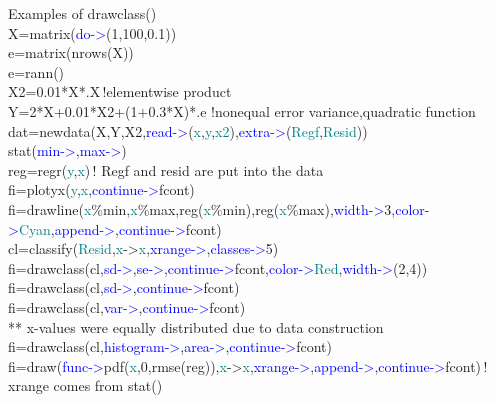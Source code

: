 \begin{example}[drawclassex]Examples of \textcolor{VioletRed}{drawclass}()\\ 
\label{drawclassex} 
\noindent X=\textcolor{VioletRed}{matrix}(\textcolor{blue}{do->}(1,100,0.1))\\ 
e=\textcolor{VioletRed}{matrix}(\textcolor{VioletRed}{nrows}(X))\\ 
e=\textcolor{VioletRed}{rann}()\\ 
X2=0.01*X*.X\,{\color{ForestGreen}!elementwise product}\\ 
Y=2*X+0.01*X2+(1+0.3*X)*.e\,\,{\color{ForestGreen}!nonequal error variance,quadratic function}\\ 
dat=\textcolor{VioletRed}{newdata}(X,Y,X2,\textcolor{blue}{read->}(\textcolor{teal}{x},\textcolor{teal}{y},\textcolor{teal}{x2}),\textcolor{blue}{extra->}(\textcolor{teal}{Regf},\textcolor{teal}{Resid}))\\ 
\textcolor{VioletRed}{stat}(\textcolor{blue}{min->},\textcolor{blue}{max->})\\ 
reg=\textcolor{VioletRed}{regr}(\textcolor{teal}{y},\textcolor{teal}{x})\,{\color{ForestGreen}! Regf and resid are put into the data}\\ 
fi=\textcolor{VioletRed}{plotyx}(\textcolor{teal}{y},\textcolor{teal}{x},\textcolor{blue}{continue->}fcont)\\ 
fi=\textcolor{VioletRed}{drawline}(\textcolor{teal}{x}\%min,\textcolor{teal}{x}\%max,reg(\textcolor{teal}{x}\%min),reg(\textcolor{teal}{x}\%max),\textcolor{blue}{width->}3,\textcolor{blue}{color->}\textcolor{teal}{Cyan},\textcolor{blue}{append->},\textcolor{blue}{continue->}fcont)\\ 
cl=\textcolor{VioletRed}{classify}(\textcolor{teal}{Resid},\textcolor{teal}{x}->\textcolor{teal}{x},\textcolor{blue}{xrange->},\textcolor{blue}{classes->}5)\\ 
fi=\textcolor{VioletRed}{drawclass}(cl,\textcolor{blue}{sd->},\textcolor{blue}{se->},\textcolor{blue}{continue->}fcont,\textcolor{blue}{color->}\textcolor{teal}{Red},\textcolor{blue}{width->}(2,4))\\ 
fi=\textcolor{VioletRed}{drawclass}(cl,\textcolor{blue}{sd->},\textcolor{blue}{continue->}fcont)\\ 
fi=\textcolor{VioletRed}{drawclass}(cl,\textcolor{blue}{var->},\textcolor{blue}{continue->}fcont)\\ 
{\color{ForestGreen}** x-values were equally distributed due to data construction}\\ 
fi=\textcolor{VioletRed}{drawclass}(cl,\textcolor{blue}{histogram->},\textcolor{blue}{area->},\textcolor{blue}{continue->}fcont)\\ 
fi=\textcolor{VioletRed}{draw}(\textcolor{blue}{func->}\textcolor{VioletRed}{pdf}(\textcolor{teal}{x},0,\textcolor{VioletRed}{rmse}(reg)),\textcolor{teal}{x}->\textcolor{teal}{x},\textcolor{blue}{xrange->},\textcolor{blue}{append->},\textcolor{blue}{continue->}fcont)\,{\color{ForestGreen}! xrange comes from stat()}\\ 
\end{example} 
